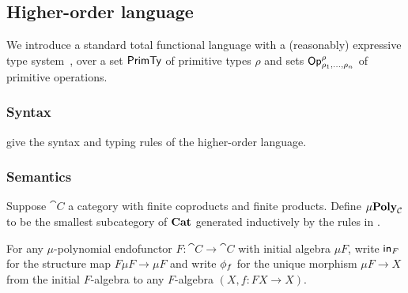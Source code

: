 \subsection{Higher-order language}

We introduce a standard total functional language with a (reasonably) expressive type
system~\cite{crole94,pitts01,santocanale02}, over a set $\mathsf{PrimTy}$ of primitive types $\rho$ and sets
$\mathsf{Op}^\rho_{\rho_1,\ldots,\rho_n}$ of primitive operations.

\subsubsection{Syntax}





 give the syntax and typing rules of the higher-order language.

\subsubsection{Semantics}




\begin{definition}[$\mu$-polynomial]
Suppose $\cat{C}$ a category with finite coproducts and finite products. Define $\mu\mathbf{Poly}_{\mathcal{C}}$ to be the
smallest subcategory of $\mathbf{Cat}$ generated inductively by the rules in .
\end{definition}

For any $\mu$-polynomial endofunctor $F: \cat{C} \to \cat{C}$ with initial algebra $\mu F$, write $\mathsf{in}_F$
for the structure map $F\mu F \to \mu F$ and write $\phi_f$ for the unique morphism $\mu F \to X$ from the
initial $F$-algebra to any $F$-algebra $(X, f: FX \to X)$.

